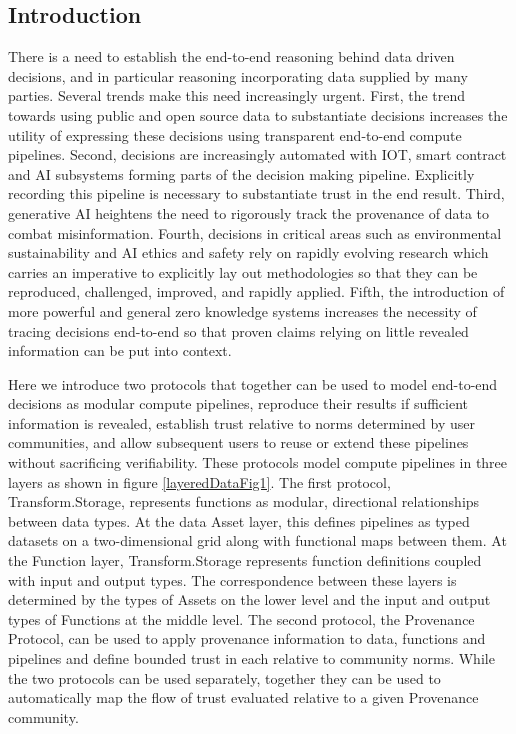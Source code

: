 \documentclass[9pt, oneside]{article}   	%
\begin{document}
\begin{multicols}{2}
\setlength{\parskip}{0.1\baselineskip} %
\section{Introduction}

There is a need to establish the end-to-end reasoning behind data driven decisions, and in particular reasoning incorporating data supplied by many parties. Several trends make this need increasingly urgent. First, the trend towards using public and open source data to substantiate decisions increases the utility of expressing these decisions using transparent end-to-end compute pipelines. Second, decisions are increasingly automated with IOT, smart contract and AI subsystems forming parts of the decision making pipeline. Explicitly recording this pipeline is necessary to substantiate trust in the end result. Third, generative AI heightens the need to rigorously track the provenance of data to combat misinformation. Fourth, decisions in critical areas such as environmental sustainability and AI ethics and safety rely on rapidly evolving research which carries an imperative to explicitly lay out methodologies so that they can be reproduced, challenged, improved, and rapidly applied. Fifth, the introduction of more powerful and general zero knowledge systems increases the necessity of tracing decisions end-to-end so that proven claims relying on little revealed information can be put into context.

Here we introduce two protocols that together can be used to model end-to-end decisions as modular compute pipelines, reproduce their results if sufficient information is revealed, establish trust relative to norms determined by user communities, and allow subsequent users to reuse or extend these pipelines without sacrificing verifiability. These protocols model compute pipelines in three layers as shown in figure \ref{layeredDataFig1}. The first protocol, Transform.Storage, represents functions as modular, directional relationships between data types. At the data Asset layer, this defines pipelines as typed datasets on a two-dimensional grid along with functional maps between them. At the Function layer, Transform.Storage represents function definitions coupled with input and output types. The correspondence between these layers is determined by the types of Assets on the lower level and the input and output types of Functions at the middle level. The second protocol, the Provenance Protocol, can be used to apply provenance information to data, functions and pipelines and define bounded trust in each relative to community norms. While the two protocols can be used separately, together they can be used to automatically map the flow of trust evaluated relative to a given Provenance community.


\end{multicols}
\end{document}
